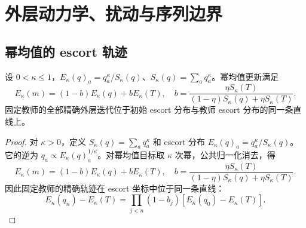 \chapter{外层动力学、扰动与序列边界}
\label{app:dynamics}
\section{幂均值的 escort 轨迹}
\begin{proposition}
设 $0<\kappa\le1$，$E_\kappa(q)_a=q_a^\kappa/S_\kappa(q)$、$S_\kappa(q)=\sum_aq_a^\kappa$。幂均值更新满足
\begin{equation}
E_\kappa(m)=(1-b)E_\kappa(q)+bE_\kappa(T),\quad
b=\frac{\eta S_\kappa(T)}{(1-\eta)S_\kappa(q)+\eta S_\kappa(T)}.
\end{equation}
固定教师的全部精确外层迭代位于初始 escort 分布与教师 escort 分布的同一条直线上。
\end{proposition}
\begin{proof}
对 $\kappa>0$，定义 $S_\kappa(q)=\sum_aq_a^\kappa$ 和 escort 分布 $E_\kappa(q)_a=q_a^\kappa/S_\kappa(q)$。它的逆为 $q_a\propto E_\kappa(q)_a^{1/\kappa}$。对幂均值目标取 $\kappa$ 次幂，公共归一化消去，得
\begin{equation}
E_\kappa(m)=(1-b)E_\kappa(q)+bE_\kappa(T),\quad
b=\frac{\eta S_\kappa(T)}
{(1-\eta)S_\kappa(q)+\eta S_\kappa(T)}.
\label{eq:escort}
\end{equation}
因此固定教师的精确轨迹在 escort 坐标中位于同一条直线：
\begin{equation}
E_\kappa(q_n)-E_\kappa(T)
=\prod_{j<n}(1-b_j)[E_\kappa(q_0)-E_\kappa(T)].
\end{equation}
\end{proof}

